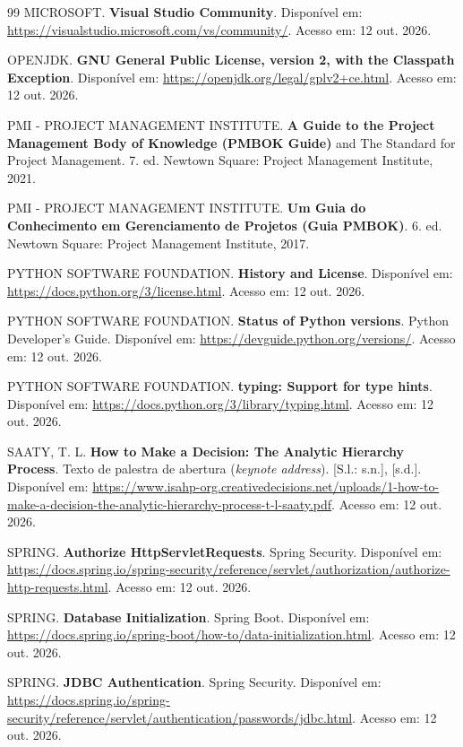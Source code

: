 \documentclass[a4paper]{article}
\begin{document}
\begin{thebibliography}{99}
MICROSOFT. \textbf{Visual Studio Community}. Disponível em: \url{https://visualstudio.microsoft.com/vs/community/}. Acesso em: 12 out. 2026.

OPENJDK. \textbf{GNU General Public License, version 2, with the Classpath Exception}. Disponível em: \url{https://openjdk.org/legal/gplv2+ce.html}. Acesso em: 12 out. 2026.

PMI - PROJECT MANAGEMENT INSTITUTE. \textbf{A Guide to the Project Management Body of Knowledge (PMBOK Guide)} and The Standard for Project Management. 7. ed. Newtown Square: Project Management Institute, 2021.

PMI - PROJECT MANAGEMENT INSTITUTE. \textbf{Um Guia do Conhecimento em Gerenciamento de Projetos (Guia PMBOK)}. 6. ed. Newtown Square: Project Management Institute, 2017.

PYTHON SOFTWARE FOUNDATION. \textbf{History and License}. Disponível em: \url{https://docs.python.org/3/license.html}. Acesso em: 12 out. 2026.

PYTHON SOFTWARE FOUNDATION. \textbf{Status of Python versions}. Python Developer's Guide. Disponível em: \url{https://devguide.python.org/versions/}. Acesso em: 12 out. 2026.

PYTHON SOFTWARE FOUNDATION. \textbf{typing: Support for type hints}. Disponível em: \url{https://docs.python.org/3/library/typing.html}. Acesso em: 12 out. 2026.

SAATY, T. L. \textbf{How to Make a Decision: The Analytic Hierarchy Process}. Texto de palestra de abertura (\textit{keynote address}). [S.l.: s.n.], [s.d.]. Disponível em: \url{https://www.isahp-org.creativedecisions.net/uploads/1-how-to-make-a-decision-the-analytic-hierarchy-process-t-l-saaty.pdf}. Acesso em: 12 out. 2026.

SPRING. \textbf{Authorize HttpServletRequests}. Spring Security. Disponível em: \url{https://docs.spring.io/spring-security/reference/servlet/authorization/authorize-http-requests.html}. Acesso em: 12 out. 2026.

SPRING. \textbf{Database Initialization}. Spring Boot. Disponível em: \url{https://docs.spring.io/spring-boot/how-to/data-initialization.html}. Acesso em: 12 out. 2026.

SPRING. \textbf{JDBC Authentication}. Spring Security. Disponível em: \url{https://docs.spring.io/spring-security/reference/servlet/authentication/passwords/jdbc.html}. Acesso em: 12 out. 2026.


\end{thebibliography}
\end{document}
